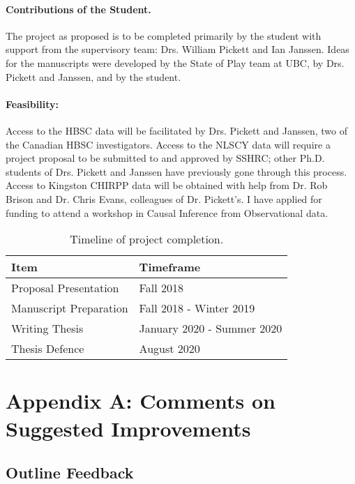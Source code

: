 \documentclass [11pt]{article}
\begin{document}
\paragraph{Contributions of the Student.} The project as proposed is to be completed primarily by the student with support from the supervisory team: Drs. William Pickett and Ian Janssen. Ideas for the manuscripts were developed by the State of Play team at UBC, by Drs. Pickett and Janssen, and by the student. 

\paragraph{Feasibility:} Access to the HBSC data will be facilitated by Drs. Pickett and Janssen, two of the Canadian HBSC investigators. Access to the NLSCY data will require a project proposal to be submitted to and approved by SSHRC; other Ph.D. students of Drs. Pickett and Janssen have previously gone through this process. Access to Kingston CHIRPP data will be obtained with help from Dr. Rob Brison and Dr. Chris Evans, colleagues of Dr. Pickett's. I have applied for funding to attend a workshop in Causal Inference from Observational data. 


\begin{table}[h]
\begin{center}
\begin{tabular}{ m{6cm} m{6cm} }
\toprule
Item & Timeframe \\
\midrule
Proposal Presentation & Fall 2018 \\
Manuscript Preparation & Fall 2018 - Winter 2019 \\ 
Writing Thesis & January 2020 - Summer 2020 \\
Thesis Defence & August 2020 \\
\bottomrule
\end{tabular}
\caption{Timeline of project completion.}
\end{center}
\end{table}

\newpage
{}


\newpage
\section{Appendix A: Comments on Suggested Improvements}

\subsection*{Outline Feedback}
\end{document}
